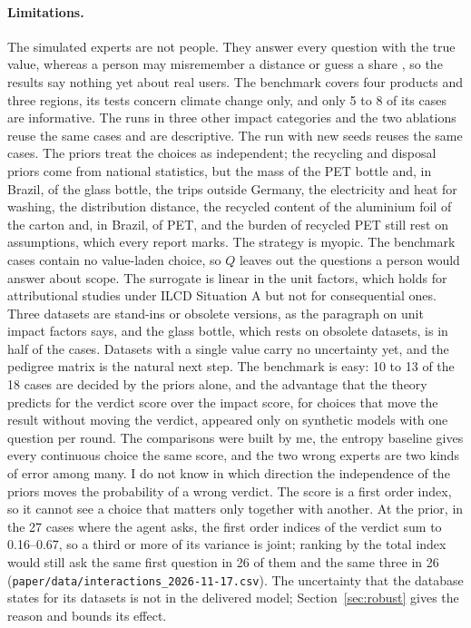 \documentclass{article}
\begin{document}
\paragraph{Limitations.}
The simulated experts are not people. They answer every question with the true value, whereas a person
may misremember a distance or guess a share \citep{ohagan2006}, so the results say nothing yet about real
users. The benchmark covers four products and three regions, its tests concern climate change only, and only 5 to 8 of its
cases are informative. The runs in three other impact categories and the two ablations reuse the same cases and are descriptive. The run with new seeds reuses the same cases. The priors treat the choices as
independent; the recycling and disposal priors come from national statistics, but the mass of the PET bottle and, in Brazil, of the glass bottle, the trips outside Germany, the electricity and heat for washing, the distribution distance, the recycled content of the aluminium foil of the carton and, in Brazil, of PET, and the burden of recycled PET still rest on
assumptions, which every report marks. The strategy is myopic. The benchmark
cases contain no value-laden choice, so $Q$ leaves out the questions a person would answer about scope. The surrogate is
linear in the unit factors, which holds for attributional studies under ILCD Situation A
\citep{ilcd2010} but not for consequential ones. Three datasets are stand-ins or obsolete versions, as the paragraph on unit impact factors says, and the glass bottle, which rests on obsolete datasets, is in half of the cases. Datasets with a single value carry no uncertainty yet,
and the pedigree matrix \citep{weidema2013} is the natural next step. The benchmark is easy: 10 to 13 of
the 18 cases are decided by the priors alone, and the advantage that the theory predicts for the verdict
score over the impact score, for choices that move the result without moving the verdict, appeared only on
synthetic models with one question per round. The comparisons were built by me, the entropy baseline
gives every continuous choice the same score, and the two wrong experts are two kinds of error among many.
I do not know in which direction the independence of the priors moves the probability of a wrong verdict.
The score is a first order index, so it cannot see a choice that matters only together with another. At the prior, in the 27 cases where the agent asks, the first order indices of the verdict sum to 0.16--0.67, so a third or more of its variance is joint; ranking by the total index would still ask the same first question in 26 of them and the same three in 26 (\texttt{paper/data/interactions\_2026-11-17.csv}).
The uncertainty that the database states for its datasets is not in the delivered model;
Section~\ref{sec:robust} gives the reason and bounds its effect.
\end{document}

